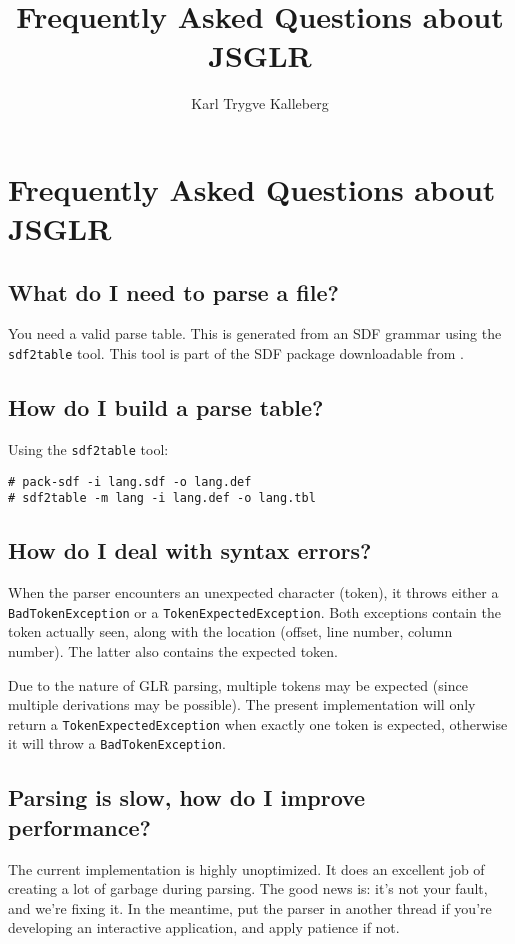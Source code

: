 \documentclass{article}
\title{Frequently Asked Questions about JSGLR}
\author{Karl Trygve Kalleberg}
\newcommand{\cc}[1]{\texttt{#1}}
\newcommand{\tp}[1]{\texttt{#1}}
\begin{document}
\section{Frequently Asked Questions about JSGLR}

\subsection{What do I need to parse a file?}

	You need a valid parse table. This is generated from an SDF grammar using the
	\cc{sdf2table} tool. This tool is part of the SDF package downloadable from
	.
	
\subsection{How do I build a parse table?}

	Using the \cc{sdf2table} tool:
	
\begin{verbatim}
# pack-sdf -i lang.sdf -o lang.def
# sdf2table -m lang -i lang.def -o lang.tbl
\end{verbatim}

\subsection{How do I deal with syntax errors?}

	When the parser encounters an unexpected character (token), it throws
	either a \tp{BadTokenException} or a \tp{TokenExpectedException}. Both
	exceptions contain the token actually seen, along with the location (offset,
	line number, column number). The latter also contains the expected token. 
	
	Due to the nature of GLR parsing, multiple tokens may be expected (since
	multiple derivations may be possible). The present implementation will only
	return a \tp{TokenExpectedException} when exactly one token is expected,
	otherwise it will throw a \tp{BadTokenException}.

\subsection{Parsing is slow, how do I improve performance?}

	The current implementation is highly unoptimized. It does an excellent job of
	creating a lot of garbage during parsing. The good news is: it's not your
	fault, and we're fixing it. In the meantime, put the parser in another thread
	if you're developing an interactive application, and apply patience if not.
 
\end{document}

